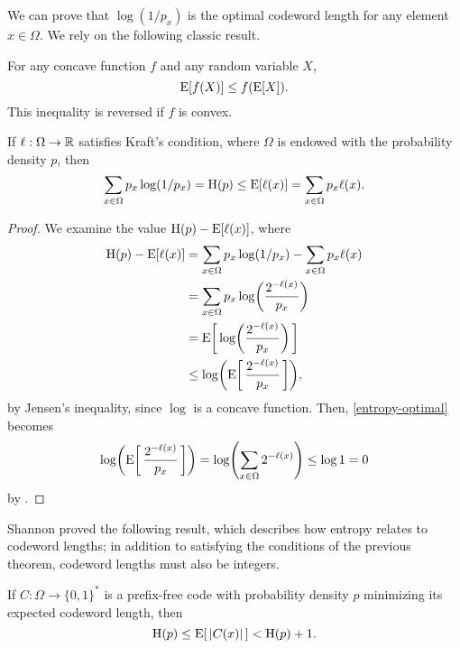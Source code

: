 We can prove that $\log (1/p_x)$ is the optimal codeword length for
any element $x \in \Omega$. We rely on the following classic result.
\begin{thm}
  For any concave function $f$ and any random variable $X$,
  \[
  \operatorname{\mathrm{E}}[f(X)] \leq f(\operatorname{\mathrm{E}}[X]) .
  \]
  This inequality is reversed if $f$ is convex.
\end{thm}
\begin{thm}
  If $\ell : \Omega \to \mathbb{R}$ satisfies Kraft's condition, where
  $\Omega$ is endowed with the probability density $p$, then
  \[
  \sum_{x \in \Omega} p_x \log (1/p_x) = \operatorname{\mathrm{H}}(p) \leq \operatorname{\mathrm{E}}[\ell(x)] = \sum_{x \in \Omega} p_x \ell(x) .
  \]
\end{thm}
\begin{proof}
  We examine the value $\operatorname{\mathrm{H}}(p) - \operatorname{\mathrm{E}}[\ell(x)]$, where
  \begin{align}
    \ent(p) - \E[\ell(x)] &= \sum_{x \in \Omega} p_x \log (1/p_x) - \sum_{x \in \Omega} p_x \ell(x) \notag \\
                          &= \sum_{x \in \Omega} p_x \log \left(\frac{2^{-\ell(x)}}{p_x}\right) \notag \\
                          &= \E\left[\,\log \left(\frac{2^{-\ell(x)}}{p_x}\right)\,\right] \notag \\
                          &\le \log \left(\E\left[\,\frac{2^{-\ell(x)}}{p_x}\,\right]\right), \eqlabel{entropy-optimal}
  \end{align}
  by Jensen's inequality, since $\log$ is a concave function. Then,
  \eqref{entropy-optimal} becomes
  \[
  \log \left(\E\left[\,\frac{2^{-\ell(x)}}{p_x}\,\right]\right) = \log
  \left( \sum_{x \in \Omega} 2^{-\ell(x)} \right) \le \log 1 = 0
  \]
  by .
\end{proof}
Shannon proved the following result, which describes how entropy
relates to codeword lengths; in addition to satisfying the conditions
of the previous theorem, codeword lengths must also be integers.
\begin{thm}
  If $C : \Omega \to \{0, 1\}^*$ is a prefix-free code with
  probability density $p$ minimizing its expected codeword length,
  then
  \[\ent(p) \leq \E\left[\,|C(x)|\,\right] < \ent(p) + 1.\]
\end{thm}


